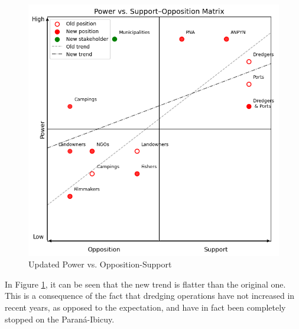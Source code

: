 \begin{figure}[H]
    \centering
    \includegraphics[width=0.70\linewidth]{figures/ch3/NewPowerVSSupport.png}
    \caption{Updated Power vs. Opposition-Support}
    \label{fig:power-supportNEW}
\end{figure}

In Figure \ref{fig:power-supportNEW}, it can be seen that the new trend is flatter than the original one. This is a consequence of the fact that dredging operations have not increased in recent years, as opposed to the expectation, and have in fact been completely stopped on the Paraná-Ibicuy.